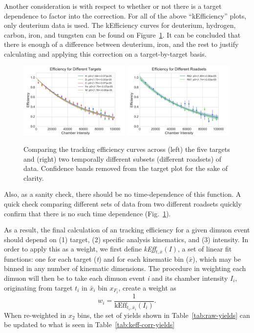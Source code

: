 Another consideration is with respect to whether or not there is a target dependence to factor into the correction. For all of the above ``kEfficiency'' plots, only deuterium data is used. The kEfficiency curves for deuterium, hydrogen, carbon, iron, and tungsten can be found on Figure~\ref{fig:keff-target-roadset}. It can be concluded that there is enough of a difference between deuterium, iron, and the rest to justify calculating and applying this correction on a target-by-target basis.
\begin{figure}
	\centering
	\includegraphics[width=0.49\textwidth]{figures/analysis/target-keff-int.png}
	\includegraphics[width=0.49\textwidth]{figures/analysis/roadset-keff-int.png}
	\caption{Comparing the tracking efficiency curves across (left) the five targets and (right) two temporally different subsets (different roadsets) of data. Confidence bands removed from the target plot for the sake of clarity.}
	\label{fig:keff-target-roadset}
\end{figure}

Also, as a sanity check, there should be no time-dependence of this function. A quick check comparing different sets of data from two different roadsets quickly confirm that there is no such time dependence (Fig.~\ref{fig:keff-target-roadset}).

As a result, the final calculation of an tracking efficiency for a given dimuon event should depend on (1) target, (2) specific analysis kinematics, and (3) intensity. In order to apply this as a weight, we first define \emph{kEff}$_{t, \bar{x}}(I)$, a set of linear fit functions: one for each target (\emph{t}) and for each kinematic bin ($\bar{x}$), which may be binned in any number of kinematic dimensions. The procedure in weighting each dimuon will then be to take each dimuon event \emph{i} and its chamber intensity $I_i$, originating from target $t_i$ in $\bar{x}_i$ bin $x_{F_i}$, create a weight as
\begin{equation}
w_i = \frac{1}{\text{kEff}_{t_i, \bar{x}_i}(I_i)}.
\end{equation}
When re-weighted in $x_2$ bins, the set of yields shown in Table~\ref{tab:raw-yields} can be updated to what is seen in Table~\ref{tab:keff-corr-yields}

